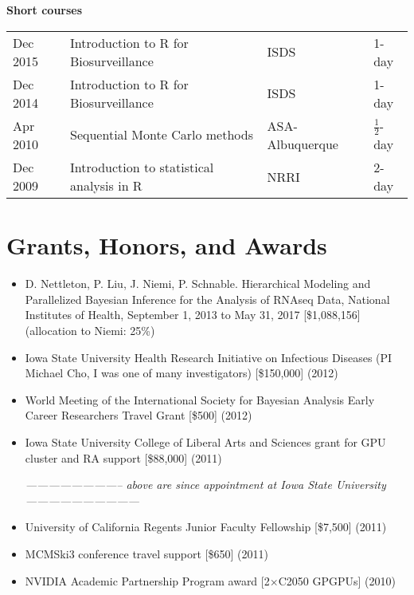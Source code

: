 \documentclass[overlapped,line]{res}
\newcommand{\sinceappt}{\emph{-------------------------- above are since appointment at Iowa State University ------------------------------}}
\newcommand{\sinceappt}{}
\begin{document}
\begin{resume}
{\bf Short courses}

\begin{tabular}{llll}
Dec 2015 & Introduction to R for Biosurveillance & ISDS & 1-day \\
Dec 2014 & Introduction to R for Biosurveillance & ISDS & 1-day \\
Apr 2010 & Sequential Monte Carlo methods & ASA-Albuquerque & $\frac{1}{2}$-day \\
Dec 2009 & Introduction to statistical analysis in R & NRRI & 2-day
\end{tabular}



\section{\bf Grants, Honors, and Awards}

\begin{itemize}
\item D. Nettleton, P. Liu, J. Niemi, P. Schnable. Hierarchical Modeling and Parallelized Bayesian Inference for the Analysis of RNAseq Data, National Institutes of Health, September 1, 2013 to May 31, 2017 [\$1,088,156] (allocation to Niemi: 25\%)

\item Iowa State University Health Research Initiative on Infectious Diseases (PI Michael Cho, I was one of many investigators) [\$150,000] (2012)
\item World Meeting of the International Society for Bayesian Analysis Early Career Researchers Travel Grant [\$500] (2012)
\item Iowa State University College of Liberal Arts and Sciences grant for GPU cluster and RA support [\$88,000] (2011)

\sinceappt

\item University of California Regents Junior Faculty Fellowship [\$7,500] (2011)
\item MCMSki3 conference travel support [\$650] (2011)
\item NVIDIA Academic Partnership Program award [2$\times$C2050 GPGPUs] (2010)




\end{itemize}
\end{resume}
\end{document}
